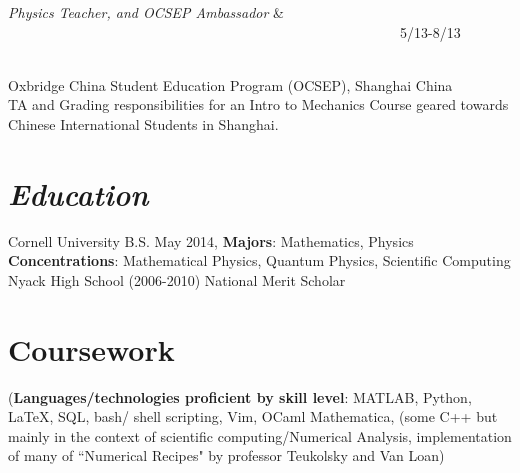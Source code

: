 {\begin{resume}
\begin{ncolumn}{2}
{\it Physics Teacher, and OCSEP Ambassador}  &   ~~~~~~~~~~~~~~~~~~~~~~~~~~~~~~~~~~~~~~~~~~~~~~~~~~~~~~~~5/13-8/13
\end{ncolumn}\\
Oxbridge China Student Education Program (OCSEP), Shanghai China\\
TA and Grading responsibilities for an Intro to Mechanics Course geared towards Chinese International Students in Shanghai.


\section{\sl\bf  Education}
Cornell University B.S. May 2014,
\textbf{Majors}: Mathematics, Physics \textbf{Concentrations}: Mathematical
Physics, Quantum Physics, Scientific Computing
Nyack High School (2006-2010)
National Merit Scholar

\section{\textbf{Coursework}}
({\bf Languages/technologies proficient by skill level}:
MATLAB, Python, LaTeX, SQL, bash/ shell scripting, Vim, OCaml Mathematica, (some C++ but mainly in the context of scientific computing/Numerical Analysis, implementation of many of ``Numerical Recipes" by professor Teukolsky and Van Loan)


\end{resume}}

